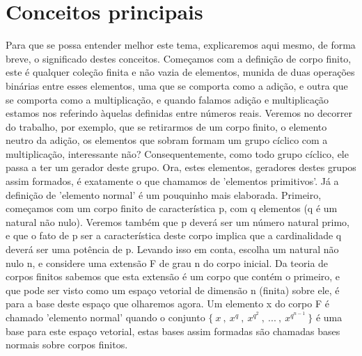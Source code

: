 \documentclass[12pt,twoside]{article}
\begin{document}

  \section{Conceitos principais}
    Para que se possa entender melhor este tema, explicaremos aqui mesmo, de
    forma breve, o significado destes conceitos. Começamos com a definição de corpo
    finito, este é qualquer coleção finita e não vazia de elementos, munida de duas
    operações binárias entre esses elementos, uma que se comporta como a adição, e
    outra que se comporta como a multiplicação, e quando falamos adição e
    multiplicação estamos nos referindo àquelas definidas entre números reais. Veremos
    no decorrer do trabalho, por exemplo, que se retirarmos de um corpo finito, o
    elemento neutro da adição, os elementos que sobram formam um grupo cíclico com
    a multiplicação, interessante não? Consequentemente, como todo grupo cíclico, ele
    passa a ter um gerador deste grupo. Ora, estes elementos, geradores destes grupos
    assim formados, é exatamente o que chamamos de 'elementos primitivos'. Já a
    definição de 'elemento normal' é um pouquinho mais elaborada. Primeiro,
    começamos com um corpo finito de característica p, com q elementos (q é um
    natural não nulo). Veremos também que p deverá ser um número natural primo, e
    que o fato de p ser a característica deste corpo implica que a cardinalidade q deverá
    ser uma potência de p. Levando isso em conta, escolha um natural não nulo n, e
    considere uma extensão F de grau n do corpo inicial. Da teoria de corpos finitos
    sabemos que esta extensão é um corpo que contém o primeiro, e que pode ser visto
    como um espaço vetorial de dimensão n (finita) sobre ele, é para a base deste
    espaço que olharemos agora. Um elemento x do corpo F é chamado 'elemento normal' quando o 
    conjunto $\{ \ x \ , \ x^{q} \ , \ x^{q^{2}} \ , \ ... \ , \ x^{q^{n-1}} \ \}$ é uma base 
    para este espaço vetorial, estas bases assim formadas são chamadas bases 
    normais sobre corpos finitos. \\
    

\end{document}
